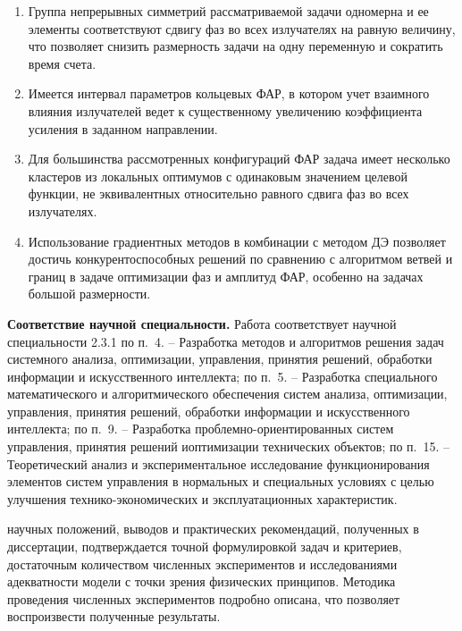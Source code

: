 {}
\begin{enumerate}[beginpenalty=10000] %
  \item Группа непрерывных симметрий рассматриваемой задачи одномерна и ее элементы соответствуют сдвигу фаз во всех излучателях на равную величину, что позволяет снизить размерность задачи на одну переменную и сократить время счета.
  \item Имеется интервал параметров кольцевых ФАР, в котором учет взаимного влияния излучателей ведет к существенному увеличению коэффициента усиления в заданном направлении.
  \item Для большинства рассмотренных конфигураций ФАР задача имеет несколько кластеров из локальных оптимумов с одинаковым значением целевой функции, не эквивалентных относительно равного сдвига фаз во всех излучателях.
  \item Использование градиентных методов в комбинации с методом ДЭ позволяет достичь конкурентоспособных решений по сравнению с алгоритмом ветвей и границ в задаче оптимизации фаз и амплитуд ФАР, особенно на задачах большой размерности.
\end{enumerate}

{\textbf{Соответствие научной специальности.}} Работа соответствует
научной специальности 2.3.1 по п.~4. -- Разработка методов и алгоритмов решения задач системного анализа, оптимизации, управления, принятия решений, обработки информации и искусственного интеллекта; по п.~5. -- Разработка специального математического и алгоритмического обеспечения систем анализа, оптимизации, управления, принятия решений, обработки информации и искусственного интеллекта; по п.~9. -- Разработка проблемно-ориентированных систем управления, принятия решений иоптимизации технических объектов; по п.~15. -- Теоретический анализ и экспериментальное исследование функционирования элементов систем управления в нормальных и специальных условиях с целью улучшения технико-экономических и эксплуатационных характеристик.


{\reliability}  научных положений, выводов и практических рекомендаций,
полученных в диссертации, подтверждается  точной формулировкой задач и критериев, достаточным количеством
численных экспериментов и исследованиями адекватности модели с точки зрения физических принципов.
Методика проведения численных экспериментов подробно описана,
что позволяет воспроизвести полученные результаты.


